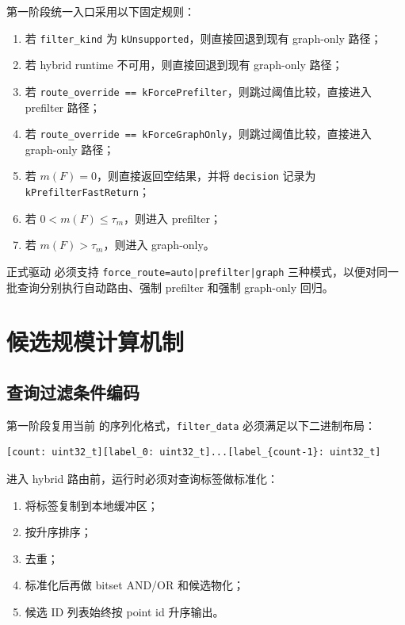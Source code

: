 \documentclass[UTF8]{ctexart}
\begin{document}
第一阶段统一入口采用以下固定规则：

\begin{enumerate}
\item 若 \texttt{filter\_kind} 为 \texttt{kUnsupported}，则直接回退到现有 graph-only 路径；
\item 若 hybrid runtime 不可用，则直接回退到现有 graph-only 路径；
\item 若 \texttt{route\_override == kForcePrefilter}，则跳过阈值比较，直接进入 prefilter 路径；
\item 若 \texttt{route\_override == kForceGraphOnly}，则跳过阈值比较，直接进入 graph-only 路径；
\item 若 \(m(F)=0\)，则直接返回空结果，并将 \texttt{decision} 记录为 \texttt{kPrefilterFastReturn}；
\item 若 \(0 < m(F) \le \tau_m\)，则进入 prefilter；
\item 若 \(m(F) > \tau_m\)，则进入 graph-only。
\end{enumerate}

正式驱动  必须支持 \texttt{force\_route=auto|prefilter|graph} 三种模式，以便对同一批查询分别执行自动路由、强制 prefilter 和强制 graph-only 回归。

\section{候选规模计算机制}

\subsection{查询过滤条件编码}
第一阶段复用当前  的序列化格式，\texttt{filter\_data} 必须满足以下二进制布局：

\begin{verbatim}
[count: uint32_t][label_0: uint32_t]...[label_{count-1}: uint32_t]
\end{verbatim}

进入 hybrid 路由前，运行时必须对查询标签做标准化：

\begin{enumerate}
\item 将标签复制到本地缓冲区；
\item 按升序排序；
\item 去重；
\item 标准化后再做 bitset AND/OR 和候选物化；
\item 候选 ID 列表始终按 point id 升序输出。
\end{enumerate}
\end{document}

